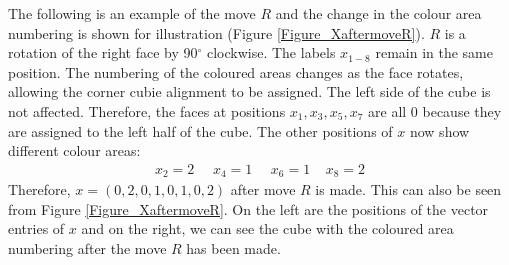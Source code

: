 \documentclass[12pt,a4paper]{article}
\theoremstyle{custom}
\begin{document}
The following is an example of the move $R$ and the change in the colour area numbering is shown for illustration (Figure \ref{Figure_XaftermoveR}). $R$ is a rotation of the right face by 90$^\circ$ clockwise.
The labels $x_{1-8}$ remain in the same position. The numbering of the coloured areas changes as the face rotates, allowing the corner cubie alignment to be assigned.
The left side of the cube is not affected. Therefore, the faces at positions $x_1, x_3, x_5, x_7$ are all 0 because they are assigned to the left half of the cube.
The other positions of $x$ now show different colour areas:
\begin{align*}
x_2 = 2 \ \ \ \ \ \ x_4 = 1 \ \ \ \ \ \ x_6 = 1 \ \ \ \ \ x_8 = 2
\end{align*}
Therefore, $x = (0, 2, 0, 1, 0, 1, 0, 2)$ after move $R$ is made. This can also be seen from Figure \ref{Figure_XaftermoveR}. On the left are the positions of the vector entries of $x$ and on the right, we can see the cube with the coloured area numbering after the move $R$ has been made.
\end{document}
